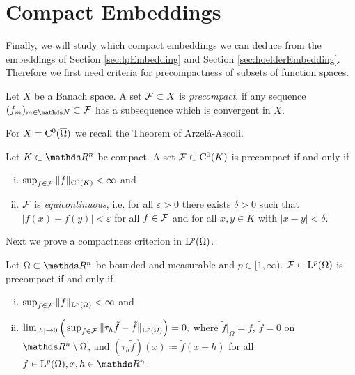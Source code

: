 \section{Compact Embeddings}

Finally, we will study which compact embeddings we can deduce from the embeddings of Section \ref{sec:lpEmbedding} and Section \ref{sec:hoelderEmbedding}.
Therefore we first need criteria for precompactness of subsets of function spaces.

\begin{defn}
  Let $X$ be a Banach space.
  A set $\mathcal{F} \subset X$ is \emph{precompact}, if any sequence $(f_m)_{m \in \N} \subset \FF$ has a subsequence which is convergent in $X$.
\end{defn}

For $X = \mathrm{C}^0(\overline\Omega)$ we recall the Theorem of Arzel\`a-Ascoli.

\begin{thm}
  \label{thm:arzelaAscoli}
  Let $K \subset \R^n$ be compact.
  A set $\mathcal{F} \subset \mathrm{C}^0(K)$ is precompact if and only if
  \begin{enumerate}[i)]
    \item $\sup_{f \in \mathcal{F}} \| f\|_{\mathrm{C}^0(K)} < \infty$ and
    \item $\mathcal{F}$ is \emph{equicontinuous}, i.e. for all $\varepsilon > 0$ there exists $\delta > 0$ such that $|f(x) - f(y)| < \varepsilon$ for all $f \in \mathcal{F}$ and for all $x,y \in K$ with $|x - y| < \delta$.
  \end{enumerate}
\end{thm}

Next we prove a compactness criterion in $\mathrm{L}^p(\Omega)$.

\begin{thm}
\label{thm:KolmogoroffRieszFrechet}
  Let $\Omega \subset \R^n$ be bounded and measurable and $p \in [1,\infty)$.
  $\mathcal{F} \subset \mathrm{L}^p(\Omega)$ is precompact if and only if
  \begin{enumerate}[i)]
    \item $\sup_{f \in \mathcal{F}} \|f\|_{\mathrm{L}^p(\Omega)} < \infty$ and
    \item $\lim_{|h| \to 0} \Big( \sup_{f \in \mathcal{F}} \| \tau_h \tilde f - \tilde f \|_{\mathrm{L}^p(\Omega)}\Big) = 0,$ where $\tilde f|_\Omega = f$, $\tilde f = 0$ on  $\R^n \setminus \Omega$, and $(\tau_h \tilde f)(x) \coloneqq \tilde f (x + h)$ for all $f \in \Ell^p(\Omega), x,h \in \R^n$.
  \end{enumerate}
\end{thm}

